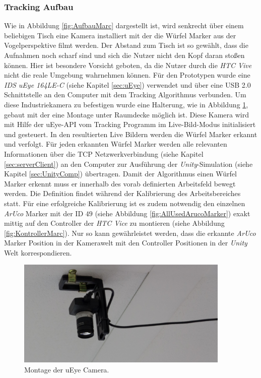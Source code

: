 \subsubsection{Tracking Aufbau}
Wie in Abbildung \ref{fig:AufbauMarc} dargestellt ist, wird senkrecht über einem beliebigen Tisch eine Kamera installiert mit der die Würfel Marker aus der Vogelperspektive filmt werden. Der Abstand zum Tisch ist so gewählt, dass die Aufnahmen noch scharf sind und sich die Nutzer nicht den Kopf daran stoßen können. Hier ist besondere Vorsicht geboten, da die Nutzer durch die \textit{HTC Vive} nicht die reale Umgebung wahrnehmen können. Für den Prototypen wurde eine \textit{IDS uEye 164LE-C} (siehe Kapitel \ref{sec:uEye}) verwendet und über eine USB 2.0 Schnittstelle an den Computer mit dem Tracking Algorithmus verbunden. Um diese Industriekamera zu befestigen wurde eine Halterung, wie in Abbildung \ref{fig:uEyeMontage}, gebaut mit der eine Montage unter Raumdecke möglich ist. Diese Kamera wird mit Hilfe der uEye-API vom Tracking Programm im Live-Bild-Modus initialisiert und gesteuert. In den resultierten Live Bildern werden die Würfel Marker erkannt und verfolgt. Für jeden erkannten Würfel Marker werden alle relevanten Informationen über die TCP Netzwerkverbindung (siehe Kapitel \ref{sec:serverClient}) an den Computer zur Ausführung der \textit{Unity}-Simulation (siehe Kapitel \ref{sec:UnityComp}) übertragen. Damit der Algorithmus einen Würfel Marker erkennt muss er innerhalb des vorab definierten Arbeitsfeld bewegt werden. Die Definition findet während der Kalibrierung des Arbeitsbereiches statt. Für eine erfolgreiche Kalibrierung ist es zudem notwendig den einzelnen \textit{ArUco} Marker mit der ID $49$ (siehe Abbildung \ref{fig:AllUsedArucoMarker}) exakt mittig auf den Controller der \textit{HTC Vice} zu montieren (siehe Abbildung \ref{fig:KontrollerMarc}). Nur so kann gewährleistet werden, dass die erkannte \textit{ArUco} Marker Position in der Kamerawelt mit den Controller Positionen in der \textit{Unity} Welt korrespondieren.

\begin{figure}[H]
	\centering
	\includegraphics[width=4in]{Bilder/Eigene Fotos/IMG_0020.jpg}			
	\caption{Montage der uEye Camera.}
	\label{fig:uEyeMontage}
\end{figure}

